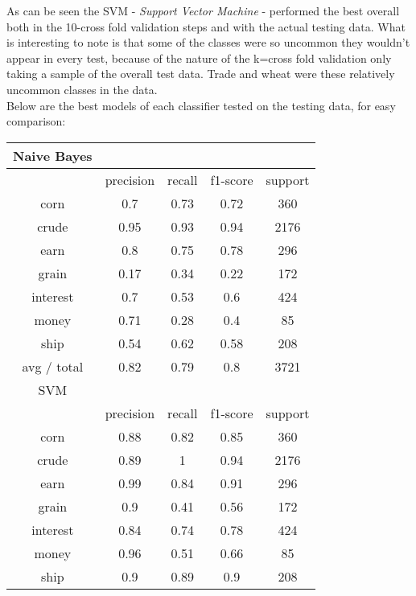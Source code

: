 \documentclass[11pt]{article}
\begin{document}
As can be seen the SVM - \textit{Support Vector Machine} - performed the best overall both in the 10-cross fold validation steps and with the actual testing data. What is interesting to note is that some of the classes were so uncommon they wouldn't appear in every test, because of the nature of the k=cross fold validation only taking a sample of the overall test data. Trade and wheat were these relatively uncommon classes in the data. \\

Below are the best models of each classifier tested on the testing data, for easy comparison:
\begin{center}
\begin{longtable}{| c | c | c | c | c |}
\hline
Naive Bayes   &           &        &          &         \\
\hline
             & precision & recall & f1-score & support \\
corn          & 0.7       & 0.73   & 0.72     & 360     \\
crude         & 0.95      & 0.93   & 0.94     & 2176    \\
earn          & 0.8       & 0.75   & 0.78     & 296     \\
grain         & 0.17      & 0.34   & 0.22     & 172     \\
interest      & 0.7       & 0.53   & 0.6      & 424     \\
money         & 0.71      & 0.28   & 0.4      & 85      \\
ship          & 0.54      & 0.62   & 0.58     & 208     \\
 avg / total   & 0.82      & 0.79   & 0.8      & 3721    \\
\hline
SVM           &           &        &          &         \\
\hline
             & precision & recall & f1-score & support \\
corn          & 0.88      & 0.82   & 0.85     & 360     \\
crude         & 0.89      & 1      & 0.94     & 2176    \\
earn          & 0.99      & 0.84   & 0.91     & 296     \\
grain         & 0.9       & 0.41   & 0.56     & 172     \\
interest      & 0.84      & 0.74   & 0.78     & 424     \\
money         & 0.96      & 0.51   & 0.66     & 85      \\
ship          & 0.9       & 0.89   & 0.9      & 208     \\

\end{longtable}
\end{center}
\end{document}
